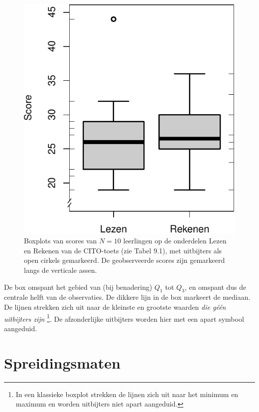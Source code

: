 \documentclass[
]{book}
\begin{document}
\begin{figure}
\centering
\includegraphics{KMS-NL_files/figure-latex/cito-boxplot-1.pdf}
\caption{\label{fig:cito-boxplot}Boxplots van scores van \(N=10\) leerlingen op de onderdelen Lezen en Rekenen van de CITO-toets (zie Tabel 9.1), met uitbijters als open cirkels gemarkeerd. De geobserveerde scores zijn gemarkeerd langs de verticale assen.}
\end{figure}

De box omspant het gebied van (bij benadering) \(Q_1\) tot \(Q_3\), en
omspant dus de centrale helft van de observaties. De dikkere lijn in de
box markeert de mediaan. De lijnen strekken zich uit naar de kleinste en
grootste waarden \emph{die géén uitbijters zijn} \footnote{In een klassieke boxplot strekken de lijnen zich uit naar het minimum en maximum \citep{Tukey77} en worden uitbijters niet apart aangeduid.}. De afzonderlijke
uitbijters worden hier met een apart symbool aangeduid.

\hypertarget{sec:spreidingsmaten}{%
\section{Spreidingsmaten}\label{sec:spreidingsmaten}}
\end{document}
